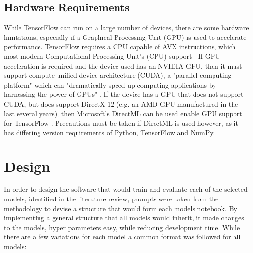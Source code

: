 \subsection{Hardware Requirements}
While TensorFlow can run on a large number of devices, there are some hardware limitations, especially if a Graphical Processing Unit (GPU) is used to accelerate performance. TensorFlow requires a CPU capable of AVX instructions, which most modern Computational Processing Unit's (CPU) support \citep{InstallT17:online}. If GPU acceleration is required and the device used has an NVIDIA GPU, then it must support compute unified device architecture (CUDA), a "parallel computing platform" which can "dramatically speed up computing applications by harnessing the power of GPUs" \citep{CUDAZone2:online}. If the device has a GPU that does not support CUDA, but does support DirectX 12 (e.g. an AMD GPU manufactured in the last several years), then Microsoft's DirectML can be used enable GPU support for TensorFlow \citep{Introduc93:online}. Precautions must be taken if DirectML is used however, as it has differing version requirements of Python, TensorFlow and NumPy.

\section{Design}
In order to design the software that would train and evaluate each of the selected models, identified in the literature review, prompts were taken from the methodology to devise a structure that would form each models notebook. By implementing a general structure that all models would inherit, it made changes to the models, hyper parameters easy, while reducing development time. While there are a few variations for each model a common format was followed for all models:

